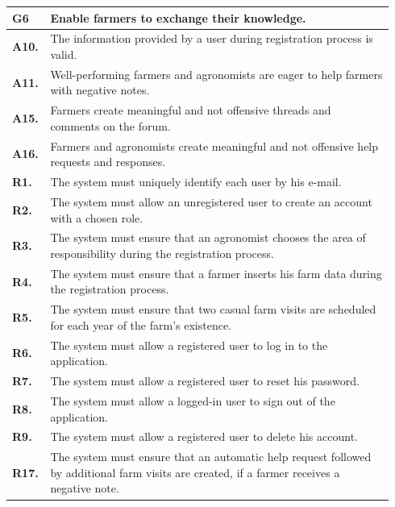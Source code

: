 \begin{longtable}{p{0.06\linewidth} p{0.88\linewidth}} 
    \toprule
    \textbf{G6} & Enable farmers to exchange their knowledge. \\ 
    \midrule
    \textbf{A10.} & The information provided by a user during registration process is valid.\\ 
    \textbf{A11.} & Well-performing farmers and agronomists are eager to help farmers with negative notes.\\ 
    \textbf{A15.} & Farmers create meaningful and not offensive threads and comments on the forum.\\ 
    \textbf{A16.} & Farmers and agronomists create meaningful and not offensive help requests and responses. \\
    \midrule
    
	\textbf{R1.} & The system must uniquely identify each user by his e-mail. \\
	\textbf{R2.} & The system must allow an unregistered user to create an account with a chosen role. \\
	\textbf{R3.} & The system must ensure that an agronomist chooses the area of responsibility during the registration process. \\
	\textbf{R4.} & The system must ensure that a farmer inserts his farm data during the registration process.\\
	\textbf{R5.} & The system must ensure that two casual farm visits are scheduled for each year of the farm's existence.\\
	\textbf{R6.} & The system must allow a registered user to log in to the application. \\
	\textbf{R7.} & The system must allow a registered user to reset his password. \\
	\textbf{R8.} & The system must allow a logged-in user to sign out of the application. \\
	\textbf{R9.} & The system must allow a registered user to delete his account. \\
	
    \textbf{R17.} & The system must ensure that an automatic help request followed by additional farm visits are created, if a farmer receives a negative note.\\
	

\end{longtable}
